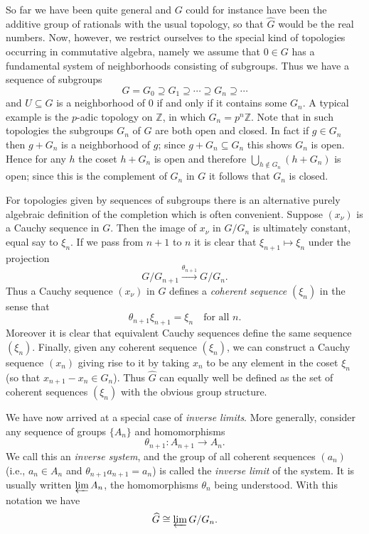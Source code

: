 So far we have been quite general and $G$ could for instance have been the additive group of rationals with the usual topology, so that $\widehat G$ would be the real numbers. Now, however, we restrict ourselves to the special kind of topologies occurring in commutative algebra, namely we assume that $0\in G$ has a fundamental system of neighborhoods consisting of subgroups. Thus we have a sequence of subgroups
\[
 G=G_0\supseteq G_1\supseteq\cdots\supseteq G_n\supseteq\cdots
\]
and $U\subseteq G$ is a neighborhood of $0$ if and only if it contains some $G_n$. A typical example is the $p$-adic topology on $\mathbb Z$, in which $G_n=p^n\mathbb Z$. Note that in such topologies the subgroups $G_n$ of $G$ are both open and closed. In fact if $g\in G_n$ then $g+G_n$ is a neighborhood of $g$; since $g+G_n\subseteq G_n$ this shows $G_n$ is open. Hence for any $h$ the coset $h+G_n$ is open and therefore $\bigcup_{h\notin G_n}(h+G_n)$ is open; since this is the complement of $G_n$ in $G$ it follows that $G_n$ is closed.

For topologies given by sequences of subgroups there is an alternative purely algebraic definition of the completion which is often convenient. Suppose $(x_\nu)$ is a Cauchy sequence in $G$. Then the image of $x_\nu$ in $G/G_n$ is ultimately constant, equal say to $\xi_n$. If we pass from $n+1$ to $n$ it is clear that $\xi_{n+1}\mapsto\xi_n$ under the projection
\[
 G/G_{n+1}\xrightarrow{\theta_{n+1}}G/G_n.
\]
Thus a Cauchy sequence $(x_\nu)$ in $G$ defines a \textit{coherent sequence} $(\xi_n)$ in the sense that
\[
 \theta_{n+1}\xi_{n+1}=\xi_n\quad\text{for all }n.
\]
Moreover it is clear that equivalent Cauchy sequences define the same sequence $(\xi_n)$. Finally, given any coherent sequence $(\xi_n)$, we can construct a Cauchy sequence $(x_n)$ giving rise to it by taking $x_n$ to be any element in the coset $\xi_n$ (so that $x_{n+1}-x_n\in G_n$). Thus $\widehat G$ can equally well be defined as the set of coherent sequences $(\xi_n)$ with the obvious group structure.

We have now arrived at a special case of \textit{inverse limits}. More generally, consider any sequence of groups $\{A_n\}$ and homomorphisms
\[
 \theta_{n+1}:A_{n+1}\longrightarrow A_n.
\]
We call this an \textit{inverse system}, and the group of all coherent sequences $(a_n)$ (i.e., $a_n\in A_n$ and $\theta_{n+1}a_{n+1}=a_n$) is called the \textit{inverse limit} of the system. It is usually written $\varprojlim A_n$, the homomorphisms $\theta_n$ being understood. With this notation we have
\[
 \widehat G\cong\varprojlim G/G_n.
\]

